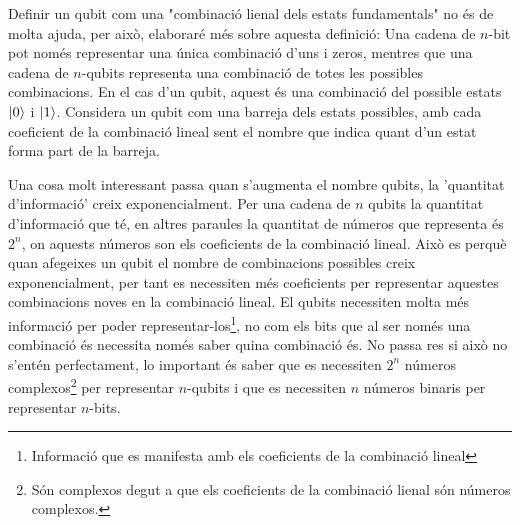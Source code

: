 Definir un qubit com una "combinació lienal dels estats fundamentals" no és de molta ajuda, per això, elaboraré més sobre aquesta definició: 
Una cadena de $n$-bit pot només representar una única combinació d'uns i zeros, mentres que una cadena de $n$-qubits representa una combinació de totes les possibles combinacions. En el cas d'un qubit, aquest és una combinació del possible estats $\ket{0}$ i $\ket{1}$. Considera un qubit com una barreja dels estats possibles, amb cada coeficient de la combinació lineal sent el nombre que indica quant d'un estat forma part de la barreja. 

Una cosa molt interessant passa quan s'augmenta el nombre qubits, la 'quantitat d'informació' creix exponencialment. Per una cadena de $n$ qubits la quantitat d'informació que té, en altres paraules la quantitat de números que representa és $2^n$, on aquests números son els coeficients de la combinació lineal. Això es perquè quan afegeixes un qubit el nombre de combinacions possibles creix exponencialment, per tant es necessiten més coeficients per representar aquestes combinacions noves en la combinació lineal. El qubits necessiten molta més informació per poder representar-los\footnote{Informació que es manifesta amb els coeficients de la combinació lineal}, no com els bits que al ser només una combinació és necessita només saber quina combinació és. No passa res si això no s'entén perfectament, lo important és saber que es necessiten $2^n$ números complexos\footnote{Són complexos degut a que els coeficients de la combinació lienal són números complexos.} per representar $n$-qubits i que es necessiten $n$ números binaris per representar $n$-bits.

